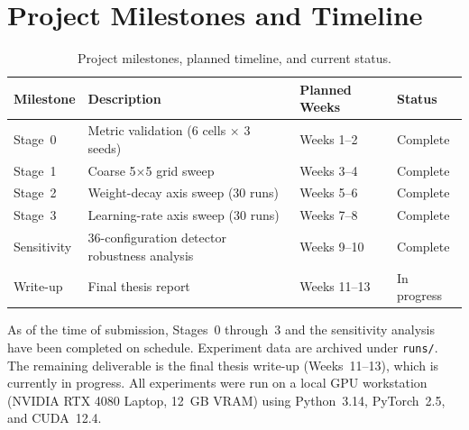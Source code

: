 \documentclass[12pt,openany,a4paper]{book}
\begin{document}
\section{Project Milestones and Timeline}

\begin{table}[htbp]
  \centering
  \caption{Project milestones, planned timeline, and current status.}
  \label{tab:milestones}
  \renewcommand{\arraystretch}{1.2}
  \begin{tabular}{llll}
    \toprule
    Milestone & Description & Planned Weeks & Status \\
    \midrule
    Stage~0 & Metric validation (6 cells $\times$ 3 seeds) & Weeks 1--2 & Complete \\
    Stage~1 & Coarse 5$\times$5 grid sweep & Weeks 3--4 & Complete \\
    Stage~2 & Weight-decay axis sweep (30 runs) & Weeks 5--6 & Complete \\
    Stage~3 & Learning-rate axis sweep (30 runs) & Weeks 7--8 & Complete \\
    Sensitivity & 36-configuration detector robustness analysis & Weeks 9--10 & Complete \\
    Write-up  & Final thesis report & Weeks 11--13 & In progress \\
    \bottomrule
  \end{tabular}
\end{table}

As of the time of submission, Stages~0 through~3 and the sensitivity
analysis have been completed on schedule.
Experiment data are archived under \texttt{runs/}.
The remaining deliverable is the final thesis write-up (Weeks~11--13),
which is currently in progress.
All experiments were run on a local GPU workstation
(NVIDIA RTX 4080 Laptop, 12~GB VRAM) using
Python~3.14, PyTorch~2.5, and CUDA~12.4.
\end{document}

